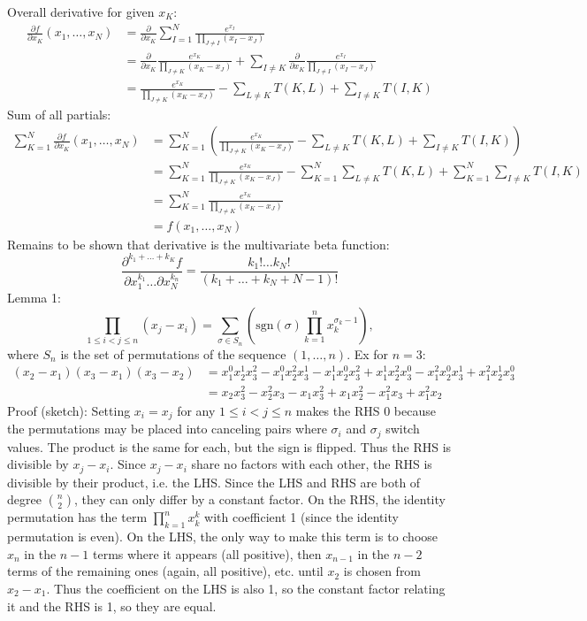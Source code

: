 \documentclass{article}
\begin{document}
Overall derivative for given $x_K$:
\begin{align*}
  \frac{\partial f}{\partial x_K}(x_1, \ldots, x_N)
  &= \frac{\partial}{\partial x_K} \sum_{I=1}^N \frac{e^{x_I}}{\prod\limits_{J \neq I}(x_I-x_J)} \\
  &= \frac{\partial}{\partial x_K} \frac{e^{x_K}}{\prod\limits_{J \neq K}(x_K-x_J)} + \sum_{I \neq K} \frac{\partial}{\partial x_K} \frac{e^{x_I}}{\prod\limits_{J \neq I}(x_I-x_J)} \\
  &= \frac{e^{x_K}}{\prod\limits_{J \neq K}(x_K-x_J)}-\sum\limits_{L \neq K}T(K, L)+\sum_{I \neq K}T(I, K)
\end{align*}
Sum of all partials:
\begin{align*}
  \sum_{K=1}^N\frac{\partial f}{\partial x_K}(x_1, \ldots, x_N)
  &= \sum_{K=1}^N\left(\frac{e^{x_K}}{\prod\limits_{J \neq K}(x_K-x_J)}-\sum\limits_{L \neq K}T(K, L)+\sum_{I \neq K}T(I, K)\right) \\
  &= \sum_{K=1}^N\frac{e^{x_K}}{\prod\limits_{J \neq K}(x_K-x_J)}-\sum_{K=1}^N\sum\limits_{L \neq K}T(K, L)+\sum_{K=1}^N\sum_{I \neq K}T(I, K) \\
  &= \sum_{K=1}^N\frac{e^{x_K}}{\prod\limits_{J \neq K}(x_K-x_J)} \\
  &= f(x_1, \ldots, x_N)
\end{align*}
Remains to be shown that derivative is the multivariate beta function:
\[\frac{\partial^{k_1+\ldots+k_K}f}{\partial x_1^{k_1}\ldots\partial x_N^{k_n}}
= \frac{k_1! \ldots k_N!}{(k_1+\ldots+k_N+N-1)!}\]
\newpage
Lemma 1:
\[\prod_{1 \leq i < j \leq n} (x_j-x_i) = \sum_{\sigma \in S_n}\left(\text{sgn}(\sigma)\prod_{k=1}^nx_k^{\sigma_k-1}\right),\]
where $S_n$ is the set of permutations of the sequence $(1, \ldots, n)$.
Ex for $n=3$:
\begin{align*}
  (x_2-x_1)(x_3-x_1)(x_3-x_2)
  &= x_1^0x_2^1x_3^2-x_1^0x_2^2x_3^1-x_1^1x_2^0x_3^2+x_1^1x_2^2x_3^0-x_1^2x_2^0x_3^1+x_1^2x_2^1x_3^0 \\
  &= x_2x_3^2-x_2^2x_3-x_1x_3^2+x_1x_2^2-x_1^2x_3+x_1^2x_2
\end{align*}
Proof (sketch): Setting $x_i=x_j$ for any $1 \leq i < j \leq n$ makes the RHS 0
because the permutations may be placed into canceling pairs
where $\sigma_i$ and $\sigma_j$ switch values.
The product is the same for each, but the sign is flipped.
Thus the RHS is divisible by $x_j-x_i$.
Since $x_j-x_i$ share no factors with each other,
the RHS is divisible by their product, i.e. the LHS.
Since the LHS and RHS are both of degree $\binom{n}{2}$,
they can only differ by a constant factor.
On the RHS, the identity permutation has the term $\prod\limits_{k=1}^nx_k^k$
with coefficient 1 (since the identity permutation is even).
On the LHS, the only way to make this term
is to choose $x_n$ in the $n-1$ terms where it appears (all positive),
then $x_{n-1}$ in the $n-2$ terms of the remaining ones (again, all positive),
etc. until $x_2$ is chosen from $x_2-x_1$.
Thus the coefficient on the LHS is also 1,
so the constant factor relating it and the RHS is 1,
so they are equal.
\end{document}
